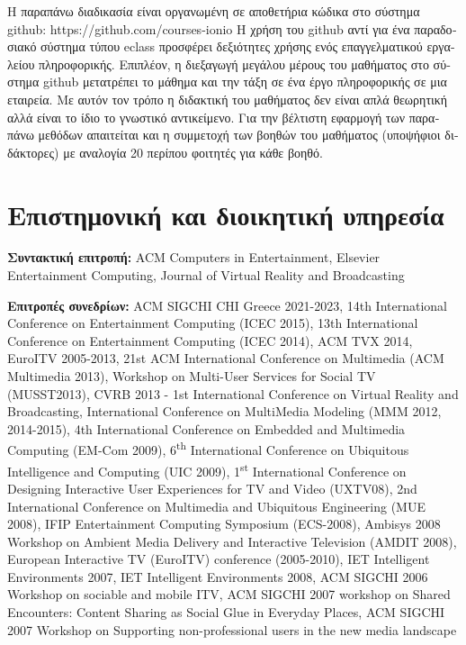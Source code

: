 \documentclass[11pt, a4paper]{article}
\begin{document}
\begin{greek}
Η παραπάνω διαδικασία είναι οργανωμένη σε αποθετήρια κώδικα στο σύστημα
github: https://github.com/courses-ionio Η χρήση του github αντί για ένα
παραδοσιακό σύστημα τύπου eclass προσφέρει δεξιότητες χρήσης ενός
επαγγελματικού εργαλείου πληροφορικής. Επιπλέον, η διεξαγωγή μεγάλου
μέρους του μαθήματος στο σύστημα github μετατρέπει το μάθημα και την
τάξη σε ένα έργο πληροφορικής σε μια εταιρεία. Με αυτόν τον τρόπο η
διδακτική του μαθήματος δεν είναι απλά θεωρητική αλλά είναι το ίδιο το
γνωστικό αντικείμενο. Για την βέλτιστη εφαρμογή των παραπάνω μεθόδων
απαιτείται και η συμμετοχή των βοηθών του μαθήματος (υποψήφιοι
διδάκτορες) με αναλογία 20 περίπου φοιτητές για κάθε βοηθό.

\section{Επιστημονική και διοικητική
υπηρεσία}\label{ux3b5ux3c0ux3b9ux3c3ux3c4ux3b7ux3bcux3bfux3bdux3b9ux3baux3ae-ux3baux3b1ux3b9-ux3b4ux3b9ux3bfux3b9ux3baux3b7ux3c4ux3b9ux3baux3ae-ux3c5ux3c0ux3b7ux3c1ux3b5ux3c3ux3afux3b1}

\textbf{Συντακτική επιτροπή:} ACM Computers in Entertainment, Elsevier
Entertainment Computing, Journal of Virtual Reality and Broadcasting

\textbf{Επιτροπές συνεδρίων:} ACM SIGCHI CHI Greece 2021-2023, 14th
International Conference on Entertainment Computing (ICEC 2015), 13th
International Conference on Entertainment Computing (ICEC 2014), ACM TVX
2014, EuroITV 2005-2013, 21st ACM International Conference on Multimedia
(ACM Multimedia 2013), Workshop on Multi-User Services for Social TV
(MUSST2013), CVRB 2013 - 1st International Conference on Virtual Reality
and Broadcasting, International Conference on MultiMedia Modeling (MMM
2012, 2014-2015), 4th International Conference on Embedded and
Multimedia Computing (EM-Com 2009), 6\textsuperscript{th} International
Conference on Ubiquitous Intelligence and Computing (UIC 2009),
1\textsuperscript{st} International Conference on Designing Interactive
User Experiences for TV and Video (UXTV08), 2nd International Conference
on Multimedia and Ubiquitous Engineering (MUE 2008), IFIP Entertainment
Computing Symposium (ECS-2008), Ambisys 2008 Workshop on Ambient Media
Delivery and Interactive Television (AMDIT 2008), European Interactive
TV (EuroITV) conference (2005-2010), IET Intelligent Environments 2007,
IET Intelligent Environments 2008, ACM SIGCHI 2006 Workshop on sociable
and mobile ITV, ACM SIGCHI 2007 workshop on Shared Encounters: Content
Sharing as Social Glue in Everyday Places, ACM SIGCHI 2007 Workshop on
Supporting non-professional users in the new media landscape


\end{greek}
\end{document}
